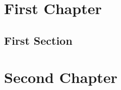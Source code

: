 \documentclass[pfe,titlesmallcaps]{isipfe}
\begin{document}
\tableofcontents
\chapter{First Chapter}
\section{First Section}
\chapter{Second Chapter}
\end{document}
